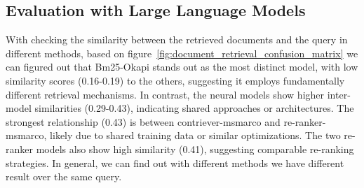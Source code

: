 \subsection{Evaluation with Large Language Models}\label{subsec:evaluation-with-large-language-models}
With checking the similarity between the retrieved documents and the query in different methods, based on figure~\ref{fig:document_retrieval_confusion_matrix} we can figured out that Bm25-Okapi stands out as the most distinct model, with low similarity scores (0.16-0.19) to the others, suggesting it employs fundamentally different retrieval mechanisms.
In contrast, the neural models show higher inter-model similarities (0.29-0.43), indicating shared approaches or architectures.
The strongest relationship (0.43) is between contriever-msmarco and re-ranker-msmarco, likely due to shared training data or similar optimizations.
The two re-ranker models also show high similarity (0.41), suggesting comparable re-ranking strategies.
In general, we can find out with different methods we have different result over the same query.

